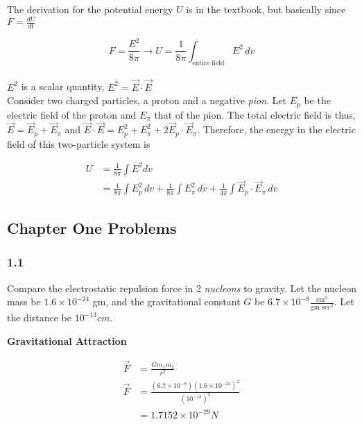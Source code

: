 \documentclass[svgnames]{article}
\begin{document}
 The derivation for the potential energy $U$ is in the textbook, but basically since $F = \frac{dU}{dt}$
 
 \[ F = \frac{E^2}{8\pi} \rightarrow U = \frac{1}{8\pi} \int_\text{entire field} E^2 \, dv \] \\
 
 $E^2$ is a scalar quantity, $E^2 = \vec{E} \cdot \vec{E}$ \\
 
 Consider two charged particles, a proton and a negative \textit{pion}. Let
 $E_p$ be the electric field of the proton and $E_\pi$ that of the pion. The
 total electric field is thus, $\vec{E} = \vec{E}_p + \vec{E}_\pi$ and $\vec{E}
 \cdot \vec{E} = E_p^2 + E_\pi^2 + 2\vec{E}_p \cdot \vec{E}_\pi$. Therefore,
 the energy in the electric field of this two-particle system is 
 
\begin{align*} 
U &= \frac{1}{8\pi} \int E^2 dv \\
&= \frac{1}{8\pi} \int E_p^2 \, dv + \frac{1}{8\pi} \int E_\pi^2 \, dv
+ \frac{1}{4\pi} \int \vec{E}_p \cdot \vec{E}_\pi \, dv
\end{align*}
 
 \vspace{20px}
 \subsection{Chapter One Problems} 
 
 \subsubsection{1.1} 
 
Compare the electrostatic repulsion force in 2 \textit{nucleons} to gravity.
Let the nucleon mass be $1.6 \times 10^{-24}$ gm, and the gravitational
constant $G$ be $ 6.7 \times 10^{-8} \frac{\text{cm}^3}{\text{gm sec}^2}$. Let
the distance be $10^{-13} cm$. 
 
 \vspace{20px} 
 
 \textbf{Gravitational Attraction} 
 
 \begin{align*} 
 \vec{F} &= \frac{Gm_1m_2}{r^2} \\
 \vec{F} &= \frac{(6.7 \times 10^{-8}) (1.6 \times 10^{-24})^2}{(10^{-13})^2} \\
 & = 1.7152 \times 10^{-29} N 
 \end{align*}
 
\end{document}
